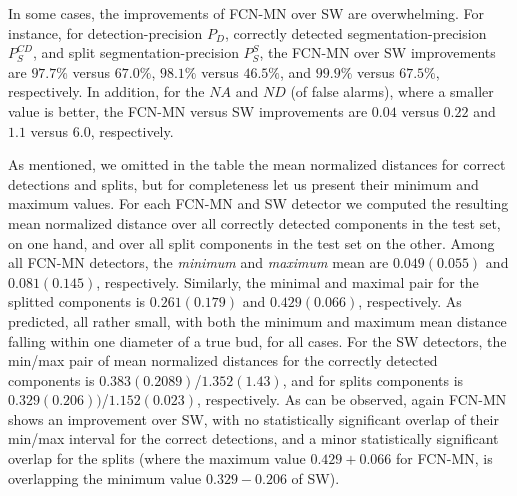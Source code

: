 \documentclass[a4paper,authoryear,review]{elsarticle}
\begin{document}
In some cases, the improvements of FCN-MN over SW are overwhelming. For instance, for detection-precision $P_D$, correctly detected segmentation-precision $P_S^{CD}$, and split segmentation-precision $P_S^{S}$, the FCN-MN over SW improvements are $97.7\%$ versus $67.0\%$, $98.1\%$ versus $46.5\%$, and $99.9\%$ versus $67.5\%$, respectively.  In addition, for the $NA$ and $ND$ (of false alarms), where a smaller value is better, the  FCN-MN versus SW improvements are $0.04$ versus $0.22$ and $1.1$ versus $6.0$, respectively. 

As mentioned, we omitted in the table the mean normalized distances for correct detections and splits, but for completeness let us present their minimum and maximum values.
%
For each FCN-MN and SW detector we computed the resulting mean normalized distance over all correctly detected components in the test set, on one hand, and over all split components in the test set on the other. 
%
Among all FCN-MN detectors, the \emph{minimum} and  \emph{maximum} mean are $0.049(0.055)$ and $0.081(0.145)$, respectively. Similarly, the minimal and maximal pair for the splitted components is $0.261(0.179)$ and $0.429(0.066)$, respectively. As predicted, all rather small, with both the minimum and maximum mean distance falling within one diameter of a true bud, for all cases.
%
For the SW detectors, the min/max pair of mean normalized distances for the correctly detected components is $0.383(0.2089)$/$1.352(1.43)$, and for splits components is $0.329(0.206))$/$1.152(0.023)$, respectively. As can be observed, again FCN-MN shows an improvement over SW, with no statistically significant overlap of their min/max interval for the correct detections, and a minor statistically significant overlap for the splits (where the maximum value $0.429 + 0.066$ for FCN-MN,  is overlapping the minimum value $0.329-0.206$ of SW).
\end{document}
